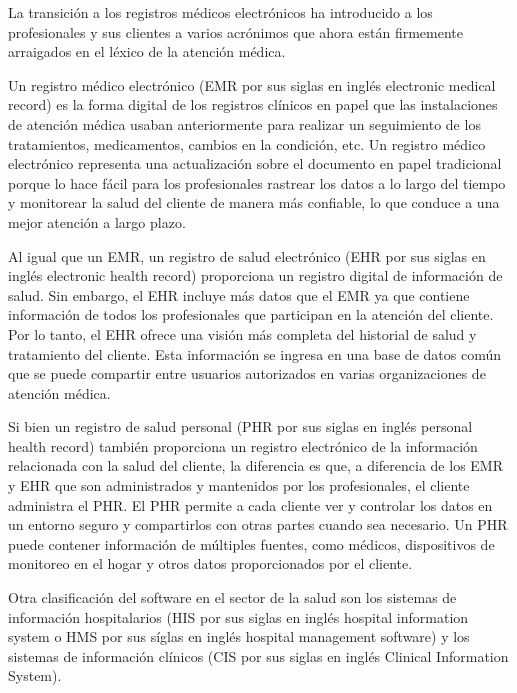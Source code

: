 La transición a los registros médicos electrónicos ha introducido a los profesionales y sus clientes a varios acrónimos que ahora están firmemente arraigados en el léxico de la atención médica.

Un registro médico electrónico (EMR por sus siglas en inglés electronic medical record) es la forma digital de los registros clínicos en papel que las instalaciones de atención médica usaban anteriormente para realizar un seguimiento de los tratamientos, medicamentos, cambios en la condición, etc. Un registro médico electrónico representa una actualización sobre el documento en papel tradicional porque lo hace fácil para los profesionales rastrear los datos a lo largo del tiempo y monitorear la salud del cliente de manera más confiable, lo que conduce a una mejor atención a largo plazo.

\vspace{1em}

Al igual que un EMR, un registro de salud electrónico (EHR por sus siglas en inglés electronic health record) proporciona un registro digital de información de salud. Sin embargo, el EHR incluye más datos que el EMR ya que contiene información de todos los profesionales que participan en la atención del cliente. Por lo tanto, el EHR ofrece una visión más completa del historial de salud y tratamiento del cliente. Esta información se ingresa en una base de datos común que se puede compartir entre usuarios autorizados en varias organizaciones de atención médica.\cite{E04}

\vspace{1em}

Si bien un registro de salud personal (PHR por sus siglas en inglés personal health record) también proporciona un registro electrónico de la información relacionada con la salud del cliente, la diferencia es que, a diferencia de los EMR y EHR que son administrados y mantenidos por los profesionales, el cliente administra el PHR. El PHR permite a cada cliente ver y controlar los datos en un entorno seguro y compartirlos con otras partes cuando sea necesario. Un PHR puede contener información de múltiples fuentes, como médicos, dispositivos de monitoreo en el hogar y otros datos proporcionados por el cliente.

\vspace{1em}

Otra clasificación del software en el sector de la salud son los sistemas de información hospitalarios (HIS por sus siglas en inglés hospital information system o HMS por sus síglas en inglés hospital management software) y los sistemas de información clínicos (CIS por sus siglas en inglés Clinical Information System). 

